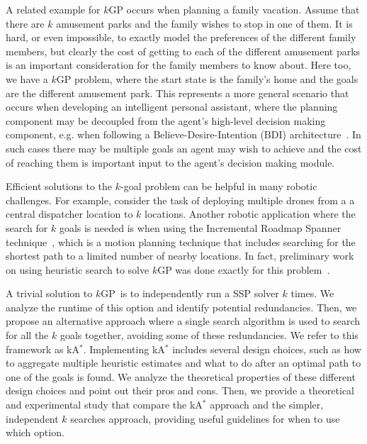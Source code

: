 \documentclass{aicom2e}
\newcommand{\kgs}{$k$GP}
\newcommand{\kastar}{kA$^*$}
\newcommand{\roni}[1]{\textbf{[RS:#1]}}
\begin{document}

A related example for \kgs{} occurs when planning a family vacation. Assume
that there are $k$ amusement parks and the family wishes to stop in one of
them. It is hard, or even impossible, to exactly model the preferences of the
different family members, but clearly the cost of getting to each of the
different amusement parks is an important consideration for the family members
to know about. Here too, we have a \kgs{} problem, where the start state is the
family's home and the goals are the different amusement park. This represents a
more general scenario that occurs when developing an intelligent personal
assistant, where the planning component may be decoupled from the agent's
high-level decision making component, e.g. when following a
Believe-Desire-Intention (BDI)
architecture~\cite{bratman1999intention,georgeff1998belief}. In such cases
there may be multiple goals an agent may wish to achieve and the cost of
reaching them is important input to the agent's decision making module.


Efficient solutions to the $k$-goal problem can be helpful in many robotic
challenges. For example, consider the task of deploying multiple drones from a
a central dispatcher location to $k$ locations. Another robotic application
where the search for $k$ goals is needed is when using the Incremental Roadmap
Spanner technique~\cite{marble2013asymptotically}, which is a motion planning
technique that includes searching for the shortest path to a limited number of
nearby locations. In fact, preliminary work on using heuristic search to solve
\kgs{} was done exactly for this problem~\cite{DobsonB14}.

A trivial solution to \kgs\ is to independently run a SSP solver $k$ times. We
analyze the runtime of this option and identify potential redundancies. Then,
we propose an alternative approach where a single search algorithm is used to
search for all the $k$ goals together, avoiding some of these redundancies. We refer
to this framework as \kastar{}. Implementing \kastar{} includes several design
choices, such as how to aggregate multiple heuristic estimates and what to do
after an optimal path to one of the goals is found. We analyze the theoretical
properties of these different design choices and point out their pros and cons.
Then, we provide a theoretical and experimental study that compare the
\kastar{} approach and the simpler, independent $k$ searches approach,
providing useful guidelines for when to use which option.
\end{document}
